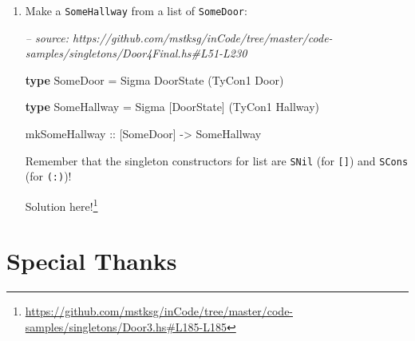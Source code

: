 \documentclass[]{article}
\newenvironment{Shaded}{}{}
\newcommand{\CommentTok}[1]{\textcolor[rgb]{0.38,0.63,0.69}{\textit{#1}}}
\newcommand{\DataTypeTok}[1]{\textcolor[rgb]{0.56,0.13,0.00}{#1}}
\newcommand{\FunctionTok}[1]{\textcolor[rgb]{0.02,0.16,0.49}{#1}}
\newcommand{\KeywordTok}[1]{\textcolor[rgb]{0.00,0.44,0.13}{\textbf{#1}}}
\newcommand{\NormalTok}[1]{#1}
\newcommand{\OtherTok}[1]{\textcolor[rgb]{0.00,0.44,0.13}{#1}}
\renewcommand{\href}[2]{#2\footnote{\url{#1}}}
\begin{document}
\begin{enumerate}
\begin{Shaded}
\begin{Highlighting}[]
\KeywordTok{type} \DataTypeTok{Map}\NormalTok{ f xs }\FunctionTok{=} \DataTypeTok{Foldr} \FunctionTok{????} \FunctionTok{????}\NormalTok{ xs}
\end{Highlighting}
\end{Shaded}

  Try to mirror the value-level definition, passing in \texttt{(:)\ .\ f}, and
  use the promoted version of \texttt{(.)} from the \emph{singletons} library,
  in
  \emph{\href{http://hackage.haskell.org/package/singletons-2.5/docs/Data-Singletons-Prelude.html}{Data.Singletons.Prelude}}.
  You might find \texttt{TyCon2} helpful!

  \href{https://github.com/mstksg/inCode/tree/master/code-samples/singletons/Door3.hs\#L185-L185}{Solution
  here!}
\item
  Make a \texttt{SomeHallway} from a list of \texttt{SomeDoor}:

\begin{Shaded}
\begin{Highlighting}[]
\CommentTok{-- source: https://github.com/mstksg/inCode/tree/master/code-samples/singletons/Door4Final.hs#L51-L230}

\KeywordTok{type} \DataTypeTok{SomeDoor} \FunctionTok{=} \DataTypeTok{Sigma} \DataTypeTok{DoorState}\NormalTok{ (}\DataTypeTok{TyCon1} \DataTypeTok{Door}\NormalTok{)}

\KeywordTok{type} \DataTypeTok{SomeHallway} \FunctionTok{=} \DataTypeTok{Sigma}\NormalTok{ [}\DataTypeTok{DoorState}\NormalTok{] (}\DataTypeTok{TyCon1} \DataTypeTok{Hallway}\NormalTok{)}

\OtherTok{mkSomeHallway ::}\NormalTok{ [}\DataTypeTok{SomeDoor}\NormalTok{] }\OtherTok{->} \DataTypeTok{SomeHallway}
\end{Highlighting}
\end{Shaded}

  Remember that the singleton constructors for list are \texttt{SNil} (for
  \texttt{{[}{]}}) and \texttt{SCons} (for \texttt{(:)})!

  \href{https://github.com/mstksg/inCode/tree/master/code-samples/singletons/Door3.hs\#L185-L185}{Solution
  here!}
\end{enumerate}

\hypertarget{special-thanks}{%
\section{Special Thanks}\label{special-thanks}}
\end{document}
